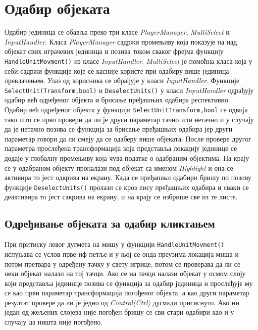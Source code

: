 \documentclass[11pt,a4paper]{report}
\begin{document}
\section{Одабир објеката}
Одабир јединица се обавља преко три класе \emph{PlayerManager}, \emph{MultiSelect} и \emph{InputHandler}. Класа \emph{PlayerManager} садржи промењиву која показује на над објекат свих играчевих јединица и позива током сваког фрејма  функцију \texttt{HandleUnitMovment()} из класе \emph{InputHandler}. \emph{MultiSelect} је помоћна класа која у себи садржи функције које се касније користе при одабиру више јединица превлачењем. Улаз од корисника се обрађује у класи \emph{InputHandler}. Функције \texttt{SelectUnit(Transform,bool)} и \texttt{DeselectUnits()} у класи \emph{InputHandler} одрађују одабир већ одређеног објекта и брисање пређашњих одабира респективно. Одабир већ одређеног објекта у функцији \texttt{SelectUnit{Transform,bool}} се одвија тако што се прво провери да ли је други параметар тачно или нетачно и у случају да је нетачно позива се функција за брисање пређашњих одабира јер други параметар говори да ли смеју да се одаберу више објеката. После провере другог параметра прослеђена трансформација која представља локацију јединице се додаје у глобалну промењиву која чува податке о одабраним објектима. На крају се у одабраном објекту проналази под објекат са именом \emph{Highlight} и она се активира то јест одкрива на екрану. Када се пређашњи одабири бришу по позиву функције \texttt{DeselectUnits()} пролази се кроз лису пређашњих одабира и сваки се деактивира то јест сакрива на екрану, и на крају се избрише све из те листе. 

\subsection{Одређивање објеката за одабир кликтањем}
При притиску левог дугмета на мишу у функцији \texttt{HandleUnitMovment()} испуњава се услов прве иф петље и у њој се онда преузима локација миша и потом претвара у  одређену тачку у свету игрице, потом се проверава да ли се неки објекат налази на тој тачци. Ако се на тачци налази објекат у осмом слоју који представља јединице позива се функција за одабир јединица и прослеђује му се као први параметар трансформација погођеног објекта, а као други параметар резултат провере да ли је једно од \emph{Control(Ctrl)} дугмади притиснуто. Ако ни један од жељених слојева није погођен бришу се сви стари одабири као и у случају да ништа није погођено. 
\end{document}
